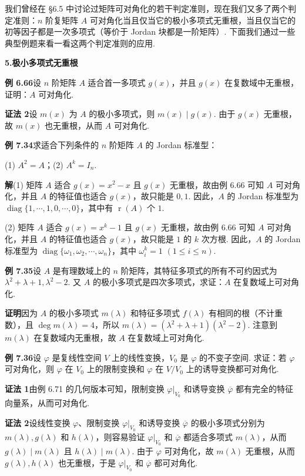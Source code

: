 \documentclass[UTF8,12pt,a4paper,fontset=fandol]{ctexart}
\begin{document}
我们曾经在 §6.5 中讨论过矩阵可对角化的若干判定准则，现在我们又多了两个判定准则：$n$ 阶复矩阵 $A$ 可对角化当且仅当它的极小多项式无重根，当且仅当它的初等因子都是一次多项式（等价于 Jordan 块都是一阶矩阵）. 下面我们通过一些典型例题来看一看这两个判定准则的应用.

\noindent\textbf{5.\quad 极小多项式无重根}

\noindent\textbf{例 6.66}\quad 设 $n$ 阶矩阵 $A$ 适合首一多项式 $g(x)$，并且 $g(x)$ 在复数域中无重根，证明：$A$ 可对角化.

\noindent\textbf{证法 2}\quad 设 $m(x)$ 为 $A$ 的极小多项式，则 $m(x)\mid g(x)$. 由于 $g(x)$ 无重根，故 $m(x)$ 也无重根，从而 $A$ 可对角化.

\noindent\textbf{例 7.34}\quad 求适合下列条件的 $n$ 阶矩阵 $A$ 的 Jordan 标准型：

(1) $A^2=A$；\qquad (2) $A^k=I_n$.

\noindent\textbf{解}\quad (1) 矩阵 $A$ 适合 $g(x)=x^2-x$ 且 $g(x)$ 无重根，故由例 6.66 可知 $A$ 可对角化，并且 $A$ 的特征值也适合 $g(x)$，故只能是 $0,1$. 因此，$A$ 的 Jordan 标准型为 $\operatorname{diag}\{1,\cdots,1,0,\cdots,0\}$，其中有 $\operatorname{r}(A)$ 个 $1$.

(2) 矩阵 $A$ 适合 $g(x)=x^k-1$ 且 $g(x)$ 无重根，故由例 6.66 可知 $A$ 可对角化，并且 $A$ 的特征值也适合 $g(x)$，故只能是 $1$ 的 $k$ 次方根. 因此，$A$ 的 Jordan 标准型为 $\operatorname{diag}\{\omega_1,\omega_2,\cdots,\omega_n\}$，其中 $\omega_i^k=1$ $(1\le i\le n)$.

\noindent\textbf{例 7.35}\quad 设 $A$ 是有理数域上的 $n$ 阶矩阵，其特征多项式的所有不可约因式为 $\lambda^2+\lambda+1,\lambda^2-2$. 又 $A$ 的极小多项式是四次多项式，求证：$A$ 在复数域上可对角化.

\noindent\textbf{证明}\quad 因为 $A$ 的极小多项式 $m(\lambda)$ 和特征多项式 $f(\lambda)$ 有相同的根（不计重数），且 $\deg m(\lambda)=4$，所以 $m(\lambda)=(\lambda^2+\lambda+1)(\lambda^2-2)$. 注意到 $m(\lambda)$ 在复数域内无重根，故 $A$ 在复数域上可对角化.

\noindent\textbf{例 7.36}\quad 设 $\varphi$ 是复线性空间 $V$ 上的线性变换，$V_0$ 是 $\varphi$ 的不变子空间. 求证：若 $\varphi$ 可对角化，则 $\varphi$ 在 $V_0$ 上的限制变换和 $\varphi$ 在 $V/V_0$ 上的诱导变换都可对角化.

\noindent\textbf{证法 1}\quad 由例 6.71 的几何版本可知，限制变换 $\varphi|_{V_0}$ 和诱导变换 $\overline{\varphi}$ 都有完全的特征向量系，从而可对角化.

\noindent\textbf{证法 2}\quad 设线性变换 $\varphi$、限制变换 $\varphi|_{V_0}$ 和诱导变换 $\overline{\varphi}$ 的极小多项式分别为 $m(\lambda),g(\lambda)$ 和 $h(\lambda)$，则容易验证 $\varphi|_{V_0}$ 和 $\overline{\varphi}$ 都适合多项式 $m(\lambda)$，从而 $g(\lambda)\mid m(\lambda)$ 且 $h(\lambda)\mid m(\lambda)$. 由于 $\varphi$ 可对角化，故 $m(\lambda)$ 无重根，从而 $g(\lambda),h(\lambda)$ 也无重根，于是 $\varphi|_{V_0}$ 和 $\overline{\varphi}$ 都可对角化.
\end{document}
